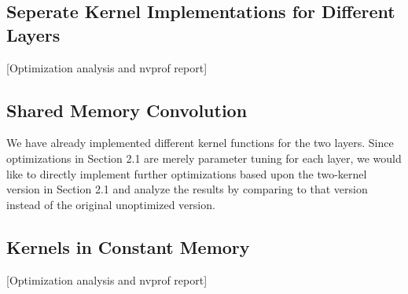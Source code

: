 \documentclass{article}
\begin{document}
\subsection{Seperate Kernel Implementations for Different Layers}
[Optimization analysis and nvprof report]

\subsection{Shared Memory Convolution}
We have already implemented different kernel functions for the two layers. Since optimizations in Section 2.1
are merely parameter tuning for each layer, we would like to directly implement further optimizations based
upon the two-kernel version in Section 2.1 and analyze the results by comparing to that version instead of
the original unoptimized version. 

\subsection{Kernels in Constant Memory}
[Optimization analysis and nvprof report]
\end{document}
